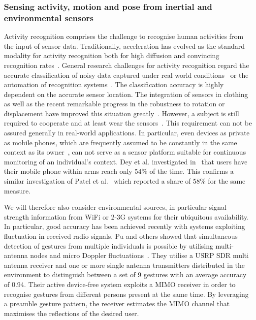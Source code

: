 \documentclass[12pt]{article}
\begin{document}
\subsubsection*{Sensing activity, motion and pose from inertial and environmental sensors}
Activity recognition comprises the challenge to recognise human activities from the input of sensor data.
Traditionally, acceleration has evolved as the standard modality for activity recognition both for high diffusion and convincing recognition rates~\cite{Pervasive_Ravi_2005,Pervasive_Cao_2012}.
General research challenges for activity recognition regard the accurate classification of noisy data captured under real world conditions~\cite{Pervasive_Bao_2004} or the automation of recognition systems~\cite{Pervasive_Ploetz_2012}.
The classification accuracy is highly dependent on the accurate sensor location.
The integration of sensors in clothing as well as the recent remarkable progress in the robustness to rotation or displacement have improved this situation greatly~\cite{Pevasive_Chavarriaga_2011}.
However, a subject is still required to cooperate and at least wear the sensors~\cite{Pervasive_Cohn_2012}.
This requirement can not be assured generally in real-world applications. 
In particular, even devices as private as mobile phones, which are frequently assumed to be constantly in the same context as its owner~\cite{Pervasive_Patridge_2008, Pervasive_Varshavsky_2008, Pervasive_Lane_2010}, can not serve as a sensor platform suitable for continuous monitoring of an individual's context.   
Dey et al. investigated in~\cite{Pervasive_Dey_2011} that users have their mobile phone within arms reach only 54\% of the time.
This confirms a similar investigation of Patel et al.~\cite{Pervasive_Patel_2006} which reported a share of 58\% for the same measure.

We will therefore also consider environmental sources, in particular signal strength information from WiFi or 2-3G systems for their ubiquitous availability. 
In particular, good accuracy has been achieved recently with systems exploiting fluctuation in received radio signals. 
Pu and others showed that simultaneous detection of gestures from multiple individuals is possible by utilising multi-antenna nodes and micro Doppler fluctuations~\cite{RFsensing_Pu_2013,RFsensing_Kim_2009}.
They utilise a USRP SDR multi antenna receiver and one or more single antenna transmitters distributed in the environment to distinguish between a set of 9 gestures with an average accuracy of 0.94. 
Their active device-free system exploits a MIMO receiver in order to recognise gestures from different persons present at the same time. 
By leveraging a preamble gesture pattern, the receiver estimates the MIMO channel that maximises the reflections of the desired user.
\end{document}
